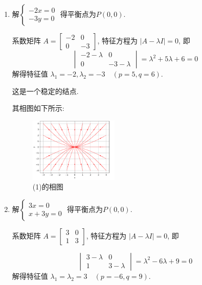 \documentclass{article}
\begin{document}
\begin{enumerate}[label=(\arabic*)]
    \item 
    解$
    \begin{cases}
        -2x = 0 \\
        -3y = 0
    \end{cases}
    $
    得平衡点为$P(0, 0)$.

    系数矩阵 $A = \begin{bmatrix} -2 & 0 \\ 0 & -3 \end{bmatrix}$,
    特征方程为 $|A - \lambda I| = 0$, 即
    $$
    \begin{vmatrix}
        -2 - \lambda & 0 \\
        0 & -3 - \lambda
    \end{vmatrix} = \lambda^2 + 5\lambda + 6 = 0
    $$
    解得特征值 $\lambda_1 = -2, \lambda_2 = -3\quad (p=5, q=6)$.

    这是一个稳定的结点.

    其相图如下所示:

    \begin{figure}[H]
        \centering
        \includegraphics[width=0.4\textwidth]{img/1.png}
        \caption{(1)的相图}
    \end{figure}

    \item
    
    解$
    \begin{cases}
        3x = 0 \\
        x + 3y = 0
    \end{cases}
    $
    得平衡点为$P(0, 0)$.

    系数矩阵 $A = \begin{bmatrix} 3 & 0 \\ 1 & 3 \end{bmatrix}$,
    特征方程为 $|A - \lambda I| = 0$, 即

    $$
    \begin{vmatrix}
        3 - \lambda & 0 \\
        1 & 3 - \lambda
    \end{vmatrix} = \lambda^2 - 6\lambda + 9 = 0
    $$
    解得特征值 $\lambda_1 = \lambda_2 = 3\quad (p=-6, q=9)$.


\end{enumerate}
\end{document}
